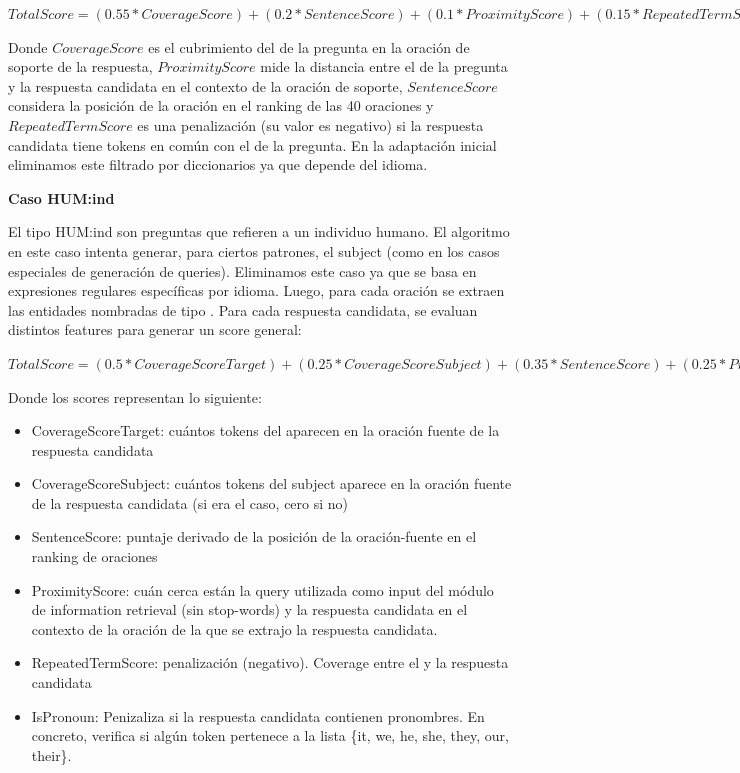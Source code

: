 $TotalScore = (0.55 * CoverageScore) + (0.2 * SentenceScore)	+ (0.1 * ProximityScore) + (0.15 * RepeatedTermScore)$

Donde $CoverageScore$ es el cubrimiento del  de la pregunta en la oración de soporte de la respuesta, $ProximityScore$ mide la distancia entre el  de la pregunta y la respuesta candidata en el contexto de la oración de soporte, $SentenceScore$ considera la posición de la oración en el ranking de las 40 oraciones y $RepeatedTermScore$ es una penalización (su valor es negativo) si la respuesta candidata tiene tokens en común con el  de la pregunta. En la adaptación inicial eliminamos este filtrado por diccionarios ya que depende del idioma. \newline

\textbf{Caso HUM:ind} \newline

El tipo HUM:ind son preguntas que refieren a un individuo humano. El algoritmo en este caso intenta generar, para ciertos patrones, el subject (como en los casos especiales de generación de queries). Eliminamos este caso ya que se basa en expresiones regulares específicas por idioma. Luego, para cada oración se extraen las entidades nombradas de tipo . Para cada respuesta candidata, se evaluan distintos features para generar un score general:

$TotalScore = (0.5 * CoverageScoreTarget)+ (0.25 * CoverageScoreSubject) + (0.35 * SentenceScore) +
					 (0.25 * ProximityScore)	+ (0.1 * RepeatedTermScore) + (0.5 * IsPronoun)$\newline

Donde los scores representan lo siguiente:
\begin{itemize}
  \item CoverageScoreTarget: cuántos tokens del  aparecen en la oración fuente de la respuesta candidata 
  \item CoverageScoreSubject: cuántos tokens del subject aparece en la oración fuente de la respuesta candidata (si era el caso, cero si no)
  \item SentenceScore: puntaje derivado de la posición de la oración-fuente en el ranking de oraciones
  \item ProximityScore: cuán cerca están la query utilizada como input del módulo de information retrieval (sin stop-words) y la respuesta candidata en el contexto de la oración de la que se extrajo la respuesta candidata.
  \item RepeatedTermScore: penalización (negativo). Coverage entre el  y la respuesta candidata
  \item IsPronoun: Penizaliza si la respuesta candidata contienen pronombres. En concreto, verifica si algún token pertenece a la lista \{it, we, he, she, they, our, their\}. 
\end{itemize}

